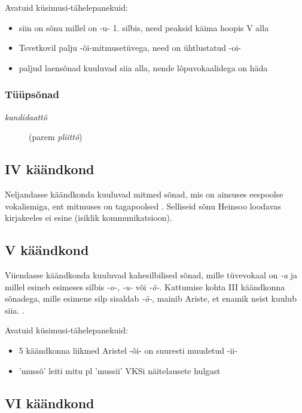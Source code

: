 \documentclass[12pt,a4paper]{article}
\newcommand{\vadja}[1]{\textit{#1}}
\begin{document}
Avatuid küsimusi-tähelepanekuid:
\begin{itemize}
\item siin on sõnu millel on -u- 1. silbis, need peaksid käima hoopis \RN{5} alla
\item Tsvetkovil palju -õi-mitmusetüvega, need on ühtlustatud -oi-
\item paljud laensõnad kuuluvad siia alla, nende lõpuvokaalidega on häda
\end{itemize}

\subsubsection*{Tüüpsõnad}
\begin{description}
\item [\textit{kandidaattõ}] (parem \textit{pliittõ})
\end{description}


\subsection{\RN{4} käändkond}

Neljandasse käändkonda kuuluvad mitmed sõnad, mis on ainsuses eespoolse vokalismiga, ent mitmuses on tagapoolsed \cite[43]{ariste_grammar_1968}. Selliseid sõnu Heinsoo loodavas kirjakeeles ei esine (isiklik kommunikatsioon). %


\subsection{\RN{5} käändkond}

Viiendasse käändkonda kuuluvad kahesilbilised sõnad, mille tüvevokaal on \vadja{-a} ja millel esineb esimeses silbis \vadja{-o-}, \vadja{-u-} või \vadja{-õ-}. Kattumise kohta \RN{3} käändkonna sõnadega, mille esimene silp sisaldab \vadja{-õ-}, mainib Ariste, et enamik neist kuulub siia. \cite[44]{ariste_grammar_1968}.

Avatuid küsimusi-tähelepanekuid:
\begin{itemize}
\item 5 käändkonna liikmed Aristel -õi- on suuresti muudetud -ii-
\item 'mussõ' leiti mitu pl 'mussii' VKSi näitelausete hulgast
\end{itemize}


\subsection{\RN{6} käändkond}
\end{document}
